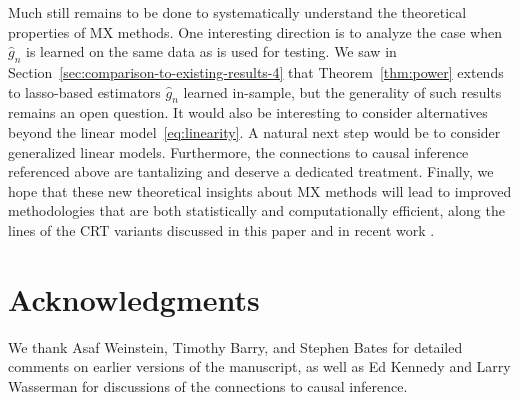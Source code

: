\documentclass[12pt]{article}
\theoremstyle{definition}
\theoremstyle{remark}
\newcommand{\prx}{\bm X}
\newcommand{\prz}{\bm Z}
\begin{document}
%



Much still remains to be done to systematically understand the theoretical properties of MX methods. One interesting direction is to analyze the case when $\widehat g_n$ is learned on the same data as is used for testing. We saw in Section~\ref{sec:comparison-to-existing-results-4} that Theorem~\ref{thm:power} extends to lasso-based estimators $\widehat g_n$ learned in-sample, but the generality of such results remains an open question. It would also be interesting to consider alternatives beyond the linear model~\eqref{eq:linearity}. A natural next step would be to consider generalized linear models. Furthermore, the connections to causal inference referenced above are tantalizing and deserve a dedicated treatment. Finally, we hope that these new theoretical insights about MX methods will lead to improved methodologies that are both statistically and computationally efficient, along the lines of the CRT variants discussed in this paper and in recent work \cite{Liu2020}.


\section*{Acknowledgments}
We thank Asaf Weinstein, Timothy Barry, and Stephen Bates for detailed comments on earlier versions of the manuscript, as well as Ed Kennedy and Larry Wasserman for discussions of the connections to causal inference.
\end{document}
